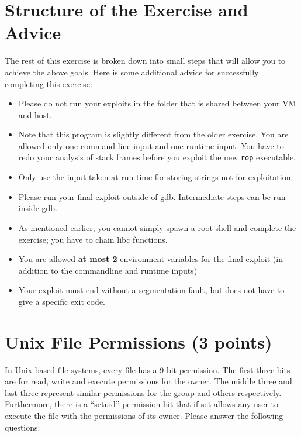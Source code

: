 \documentclass[a4paper,11pt]{article}
\begin{document}
\section*{Structure of the Exercise and Advice}

The rest of this exercise is broken down into small steps that will allow you to
achieve the above goals. Here is some additional advice for successfully
completing this exercise:

\begin{itemize}
  \item Please do not run your exploits in the folder that is shared between
  your VM and host.
  \item Note that this program is slightly different from the older exercise.
  You are allowed only one command-line input and one runtime input. You have to
  redo your analysis of stack frames before you exploit the new \texttt{rop}
  executable.
  \item Only use the input taken at run-time for storing strings not for
  exploitation.
  \item Please run your final exploit outside of gdb. Intermediate steps can be
  run inside gdb.
  \item As mentioned earlier, you cannot simply spawn a root shell and complete
  the exercise; you have to chain libc functions.
  \item You are allowed \textbf{at most 2} environment variables for the final
  exploit (in addition to the commandline and runtime inputs)
  \item Your exploit must end without a segmentation fault, but does not have to
  give a specific exit code.
\end{itemize}


\section*{Unix File Permissions (3 points)}

In Unix-based file systems, every file has a 9-bit permission. The first three
bits are for read, write and execute permissions for the owner.  The middle
three and last three represent similar permissions for the group and others
respectively. Furthermore, there is a ``setuid'' permission bit that if set
allows any user to execute the file with the permissions of its owner.
Please answer the following questions:

\renewcommand{\t}[1]{%
	{\texttt{#1}}}
\end{document}
